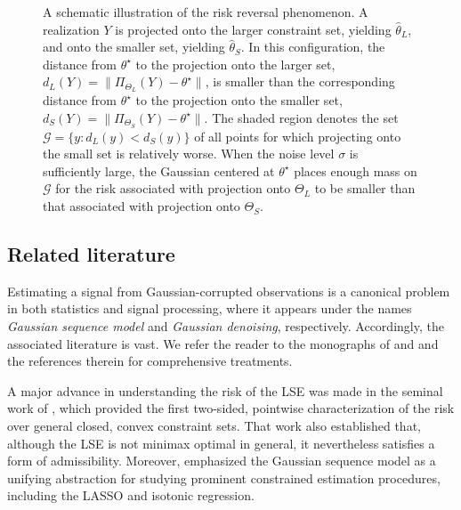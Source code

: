 \documentclass[11pt]{article}
\theoremstyle{plain}
\theoremstyle{definition}
\newcommand{\hattheta}{\hat{\theta}}
\newcommand{\mcG}{\mathcal{G}}
\begin{document}
\begin{figure}
\caption{
A schematic illustration of the risk reversal phenomenon.
A realization $Y$ is projected onto the larger constraint set, yielding $\hattheta_{L}$, and onto the smaller set, yielding $\hattheta_{S}$.
In this configuration, the distance from $\theta^\star$ to the projection onto the larger set, $d_L(Y) = \|\Pi_{\Theta_L}(Y) - \theta^\star \|$, is smaller than the corresponding distance from $\theta^\star$ to the projection onto the smaller set, $d_S(Y)= \|\Pi_{\Theta_S}(Y) - \theta^\star \|$. The shaded region denotes the set $\mcG = \{ y: d_L(y) < d_S(y)\}$ of all points for which projecting onto the small set is relatively worse. When the noise level $\sigma$ is sufficiently large, the Gaussian centered at $\theta^\star$ places enough mass on $\mcG$ for the risk associated with projection onto $\Theta_L$ to be smaller than that associated with projection onto $\Theta_S$.
}
    \label{fig:goodregions}
\end{figure}


\subsection{Related literature}

Estimating a signal from Gaussian-corrupted observations is a canonical problem in both statistics and signal processing, where it appears under the names \emph{Gaussian sequence model} and \emph{Gaussian denoising}, respectively. Accordingly, the associated literature is vast. We refer the reader to the monographs of \cite{johnstone2019gaussian} and \cite{tsybakov2009nonparametric} and the references therein for comprehensive treatments. 

A major advance in understanding the risk of the LSE was made in the seminal work of \cite{Chatterjee14}, which provided the first two-sided, pointwise characterization of the risk over general closed, convex constraint sets. That work also established that, although the LSE is not minimax optimal in general, it nevertheless satisfies a form of admissibility. Moreover, \cite{Chatterjee14} emphasized the Gaussian sequence model as a unifying abstraction for studying prominent constrained estimation procedures, including the LASSO and isotonic regression.
\end{document}
